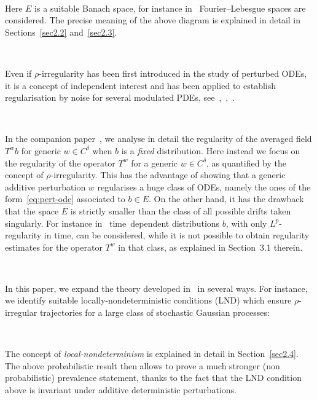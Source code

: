 \documentclass[10pt]{article}
\newcommand{\tmtextit}[1]{{\itshape{#1}}}
\begin{document}
\

Here $E$ is a suitable Banach space, for instance
in~{\cite{catelliergubinelli}} Fourier--Lebesgue spaces are considered. The
precise meaning of the above diagram is explained in detail in
Sections~\ref{sec2.2} and~\ref{sec2.3}.

\

Even if $\rho$-irregularity has been first introduced in the study of
perturbed ODEs, it is a concept of independent interest and has been applied
to establish regularisation by noise for several modulated PDEs,
see~{\cite{choukgubinelli1}},~{\cite{choukgubinelli2}},~{\cite{choukgess}}.

\

In the companion paper~{\cite{galeatigubinelli_ode}}, we analyse in detail
the regularity of the averaged field $T^w b$ for generic $w \in C^{\delta}$
when $b$ is a \tmtextit{fixed} distribution. Here instead we focus on the
regularity of the operator $T^w$ for a generic $w \in C^{\delta}$, as
quantified by the concept of $\rho$-irregularity. This has the advantage of
showing that a generic additive perturbation $w$ regularises a huge class of
ODEs, namely the ones of the form~{\eqref{eq:pert-ode}} associated to $b \in
E$. On the other hand, it has the drawback that the space $E$ is strictly
smaller than the class of all possible drifts taken singularly. For instance
in~{\cite{galeatigubinelli_ode}} time~dependent distributions $b$, with only
$L^p$-regularity in time, can be considered, while it is not possible to
obtain regularity estimates for the operator $T^w$ in that class, as explained
in Section~3.1 therein.

\

In this paper, we expand the theory developed in~{\cite{catelliergubinelli}}
in several ways. For instance, we identify suitable locally-nondeterministic
conditions (LND) which ensure $\rho$-irregular trajectories for a large class
of stochastic Gaussian processes:

\

\begin{center}
\end{center}

The concept of \tmtextit{local-nondeterminism} is explained in detail in
Section~\ref{sec2.4}. The above probabilistic result then allows to prove a
much stronger (non probabilistic) prevalence statement, thanks to the fact
that the LND condition above is invariant under additive deterministic
perturbations.
\end{document}
